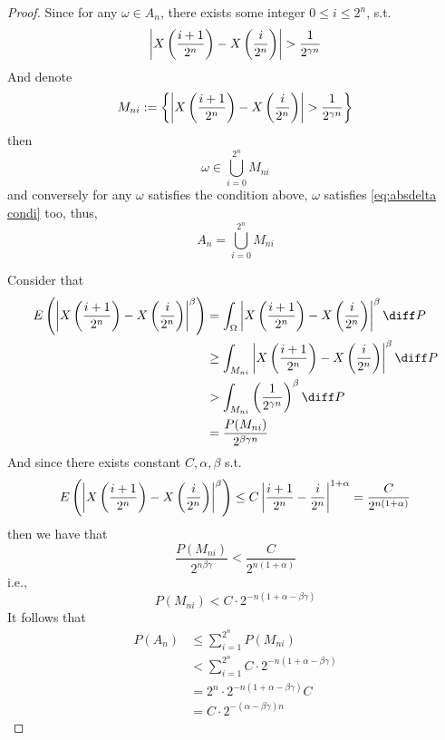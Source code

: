     \begin{subproblem}
        \item
        \begin{proof}
            Since for any $\omega\in A_n$, there exists some
            integer
            $0\leq i\leq 2^n$, s.t.
            \begin{equation}
                \label{eq:absdelta condi}
                \absdelta>\frac{1}{2^{\gamma n}}
            \end{equation}
            And denote
            \[M_{ni}:=\left\{\absdelta>\frac{1}{2^{\gamma n}}\right\}\]
            then
            \[\omega\in\bigcup_{i=0}^{2^n}M_{ni}\]
            and conversely for any $\omega$ satisfies the condition above,
            $\omega$ satisfies \cref{eq:absdelta condi} too, thus,
            \[A_n=\bigcup_{i=0}^{2^n}M_{ni}\]

            Consider that
            \[\begin{aligned}
                E\left(\absdelta^\beta\right)&=\int_\Omega\absdelta^\beta\diff P\\
                &\geq\int_{M_{ni}}\absdelta^\beta\diff P\\
                &>\int_{M_{ni}}\left(\frac{1}{2^{\gamma n}}\right)^\beta\diff P\\
                &=\frac{P(M_{ni})}{2^{\beta\gamma n}}
            \end{aligned}\]
            And since there exists constant $C,\alpha,\beta$ s.t.
            \[E\left(\left|X\left(\frac{i+1}{2^n}\right)-X\left(\frac{i}{2^n}\right)\right|^\beta\right)
            \leq C\left|\frac{i+1}{2^n}-\frac{i}{2^n}\right|^{1+\alpha}
            =\frac{C}{2^{n(1+\alpha)}}\]
            then we have that
            \[\frac{P(M_{ni})}{2^{n\beta\gamma}}
            <\frac{C}{2^{n(1+\alpha)}}\]
            i.e.,
            \[P(M_{ni})<C\cdot 2^{-n(1+\alpha-\beta\gamma)}\]
            It follows that
            \[\begin{aligned}
                P(A_n)&\leq\sum_{i=1}^{2^n}P(M_{ni})\\
                &<\sum_{i=1}^{2^n}C\cdot 2^{-n(1+\alpha-\beta\gamma)}\\
                &=2^n\cdot 2^{-n(1+\alpha-\beta\gamma)}C\\
                &=C\cdot 2^{-(\alpha-\beta\gamma)n}
            \end{aligned}\]
        \end{proof}


\end{subproblem}
